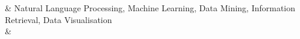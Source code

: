 %
\nohyphens{\color{OliveGreen}{Research interests}}
& Natural Language Processing, 
Machine Learning, 
Data Mining, 
Information Retrieval, 
Data Visualisation \\
& \\